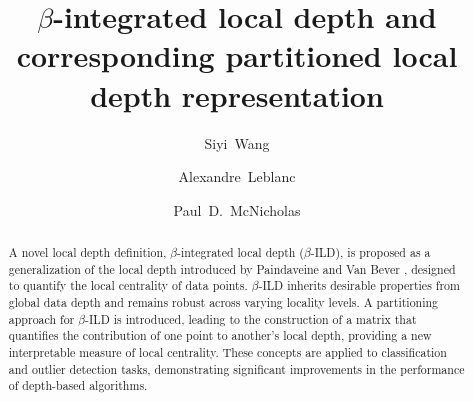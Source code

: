 \documentclass[final,3p,times]{elsarticle}
\begin{document}
\begin{frontmatter}



\title{ $\beta$-integrated local depth and corresponding partitioned local depth representation}


\author[1]{Siyi~Wang}
\author[2]{Alexandre~Leblanc}
\author[1]{Paul~D.~McNicholas}
\begin{abstract}
A novel local depth definition, $\beta$-integrated local depth ($\beta$-ILD), is proposed as a generalization of the local depth introduced by Paindaveine and Van Bever \cite{paindaveine2013depth}, designed to quantify the local centrality of data points. $\beta$-ILD inherits desirable properties from global data depth and remains robust across varying locality levels. A partitioning approach for $\beta$-ILD is introduced, leading to the construction of a matrix that quantifies the contribution of one point to another's local depth, providing a new interpretable measure of local centrality. These concepts are applied to classification and outlier detection tasks, demonstrating significant improvements in the performance of depth-based algorithms.
\end{abstract}



\end{frontmatter}
\end{document}
